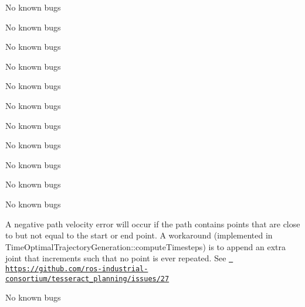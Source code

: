 \begin{DoxyRefList}
\label{bug__bug000211}%
%
No known bugs 
\item[File \mbox{\hyperlink{task__input_8cpp}{task\+\_\+input.cpp}} ]\label{bug__bug000212}%
%
No known bugs 
\item[File \mbox{\hyperlink{task__input_8h}{task\+\_\+input.h}} ]\label{bug__bug000174}%
%
No known bugs 
\item[File \mbox{\hyperlink{taskflow__container_8cpp}{taskflow\+\_\+container.cpp}} ]\label{bug__bug000213}%
%
No known bugs 
\item[File \mbox{\hyperlink{taskflow__container_8h}{taskflow\+\_\+container.h}} ]\label{bug__bug000175}%
%
No known bugs 
\item[File \mbox{\hyperlink{taskflow__generator_8h}{taskflow\+\_\+generator.h}} ]\label{bug__bug000176}%
%
No known bugs 
\item[File \mbox{\hyperlink{taskflow__interface_8h}{taskflow\+\_\+interface.h}} ]\label{bug__bug000214}%
%
No known bugs

\label{bug__bug000177}%
%
No known bugs 
\item[File \mbox{\hyperlink{taskflow__profiling__example_8cpp}{taskflow\+\_\+profiling\+\_\+example.cpp}} ]\label{bug__bug000165}%
%
No known bugs 
\item[File \mbox{\hyperlink{taskflow__visualization__utils_8h}{taskflow\+\_\+visualization\+\_\+utils.h}} ]\label{bug__bug000204}%
%
No known bugs 
\item[File \mbox{\hyperlink{tesseract__common__trajectory_8cpp}{tesseract\+\_\+common\+\_\+trajectory.cpp}} ]\label{bug__bug000247}%
%
No known bugs 
\item[Member \mbox{\hyperlink{classtesseract__planning_1_1totg_1_1Trajectory_a78d9b62367b7178b2d23eaf185969319}{tesseract\+\_\+planning\+::totg\+::Trajectory\+::Trajectory}} (const \mbox{\hyperlink{classtesseract__planning_1_1totg_1_1Path}{Path}} \&path, const Eigen\+::\+Vector\+Xd \&max\+\_\+velocity, const Eigen\+::\+Vector\+Xd \&max\+\_\+acceleration, double time\+\_\+step=0.\+001)]\label{bug__bug000243}%
%
A negative path velocity error will occur if the path contains points that are close to but not equal to the start or end point. A workaround (implemented in Time\+Optimal\+Trajectory\+Generation\+::compute\+Timesteps) is to append an extra joint that increments such that no point is ever repeated. See \href{https://github.com/ros-industrial-consortium/tesseract_planning/issues/27}{\texttt{ https\+://github.\+com/ros-\/industrial-\/consortium/tesseract\+\_\+planning/issues/27}}  
\item[File \mbox{\hyperlink{time__optimal__trajectory__generation__task__generator_8h}{time\+\_\+optimal\+\_\+trajectory\+\_\+generation\+\_\+task\+\_\+generator.h}} ]\label{bug__bug000188}%
%
No known bugs


\end{DoxyRefList}
